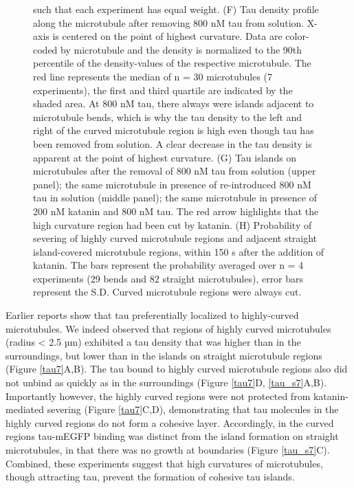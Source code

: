 \begin{figure}[h!]
{such that each experiment has equal weight. (F) Tau density profile along the microtubule after removing 800 nM tau from solution. X-axis is centered on the point of highest curvature. Data are color-coded by microtubule and the density is normalized to the 90th percentile of the density-values of the respective microtubule. The red line represents the median of n = 30 microtubules (7 experiments), the first and third quartile are indicated by the shaded area. At 800 nM tau, there always were islands adjacent to microtubule bends, which is why the tau density to the left and right of the curved microtubule region is high even though tau has been removed from solution. A clear decrease in the tau density is apparent at the point of highest curvature. (G) Tau islands on microtubules after the removal of 800 nM tau from solution (upper panel); the same microtubule in presence of re-introduced 800 nM tau in solution (middle panel); the same microtubule in presence of 200 nM katanin and 800 nM tau. The red arrow highlights that the high curvature region  had been cut by katanin. (H) Probability of severing of highly curved microtubule regions and adjacent straight island-covered microtubule regions, within 150 s after the addition of katanin. The bars represent the probability averaged over n = 4 experiments (29 bends and 82 straight microtubules), error bars represent the S.D. Curved microtubule regions were always cut. 
	}\label{taucurve}
\end{figure}
Earlier reports show that tau preferentially localized to highly-curved microtubules\parencite{Samsonov2004}. We indeed observed that regions of highly curved microtubules (radius < 2.5 µm) exhibited a tau density that was higher than in the surroundings, but lower than in the islands on straight microtubule regions (Figure \ref{tau7}A,B). The tau bound to highly curved microtubule regions also did not unbind as quickly as in the surroundings (Figure \ref{tau7}D, \ref{tau_s7}A,B). Importantly however, the highly curved regions were not protected from katanin-mediated severing (Figure \ref{tau7}C,D), demonstrating that tau molecules in the highly curved regions do not form a cohesive layer. Accordingly, in the curved regions tau-mEGFP binding was distinct from the island formation on straight microtubules, in that there was no growth at boundaries (Figure \ref{tau_s7}C). Combined, these experiments suggest that high curvatures of microtubules, though attracting tau, prevent the formation of cohesive tau islands.
